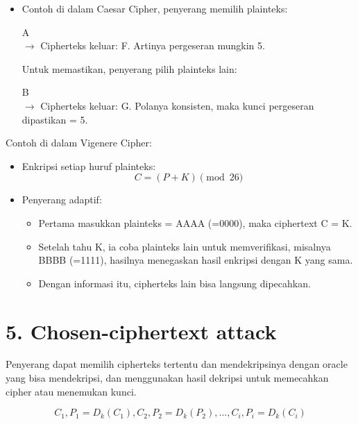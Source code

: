 \documentclass{article}
\begin{document}
\newpage


\begin{itemize}
    \item Contoh di dalam Caesar Cipher, penyerang memilih plainteks:
    
    A \\ $\rightarrow$ Cipherteks keluar: F. Artinya pergeseran mungkin 5.

    Untuk memastikan, penyerang pilih plainteks lain:
    
    B \\ $\rightarrow$ Cipherteks keluar: G. Polanya konsisten, maka kunci pergeseran dipastikan = 5.
\end{itemize}

\newpage


Contoh di dalam Vigenere Cipher:

\begin{itemize}
    \item Enkripsi setiap huruf plainteks:
    \[ C = (P + K) \pmod{26} \]
    \item Penyerang adaptif:
    \begin{itemize}
        \item Pertama masukkan plainteks = AAAA (=0000), maka ciphertext C = K.
        \item Setelah tahu K, ia coba plainteks lain untuk memverifikasi, misalnya BBBB (=1111), hasilnya menegaskan hasil enkripsi dengan K yang sama.
        \item Dengan informasi itu, cipherteks lain bisa langsung dipecahkan.
    \end{itemize}
\end{itemize}

\newpage


\section*{5. Chosen-ciphertext attack}

Penyerang dapat memilih cipherteks tertentu dan mendekripsinya dengan oracle yang bisa mendekripsi, dan menggunakan hasil dekripsi untuk memecahkan cipher atau menemukan kunci.

\[ C_1, P_1 = D_k(C_1), C_2, P_2 = D_k(P_2), \dots, C_i, P_i = D_k(C_i) \]
\end{document}
